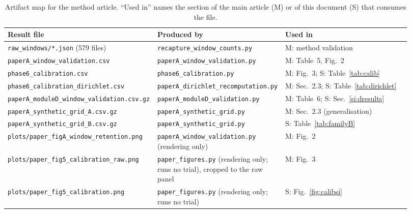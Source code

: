 \documentclass[final,5p,times,longtitle]{elsarticle}
\newenvironment{widetable}{\begin{table}[tbp]}{\end{table}}
\newenvironment{widetable}{\begin{table}[htbp]}{\end{table}}
\theoremstyle{plain}
\begin{document}
\begin{widetable}
\centering\small
\caption{Artifact map for the method article. ``Used in'' names the
section of the main article (M) or of this document (S) that consumes the
file.}
\label{tab:artifacts}
\scriptsize
\begin{tabular}{@{}>{\raggedright\arraybackslash}p{0.31\linewidth}>{\raggedright\arraybackslash}p{0.30\linewidth}>{\raggedright\arraybackslash}p{0.31\linewidth}@{}}
\toprule
Result file & Produced by & Used in \\
\midrule
\texttt{raw\_\allowbreak{}windows/*.json} (579 files) & \texttt{recapture\_\allowbreak{}window\_\allowbreak{}counts.py} & M: method validation \\
\texttt{paperA\_\allowbreak{}window\_\allowbreak{}validation.csv} & \texttt{paperA\_\allowbreak{}window\_\allowbreak{}validation.py} & M: Table~5, Fig.~2 \\
\texttt{phase6\_\allowbreak{}calibration.csv} & \texttt{phase6\_\allowbreak{}calibration.py} & M: Fig.~3; S: Table~\ref{tab:calib} \\
\texttt{phase6\_\allowbreak{}calibration\_\allowbreak{}dirichlet.csv} & \texttt{paperA\_\allowbreak{}dirichlet\_\allowbreak{}recomputation.py} & M: Sec.~2.3; S: Table~\ref{tab:dirichlet} \\
\texttt{paperA\_\allowbreak{}moduleD\_\allowbreak{}window\_\allowbreak{}validation.csv.gz} & \texttt{paperA\_\allowbreak{}moduleD\_\allowbreak{}validation.py} & M: Table~6; S: Sec.~\ref{si:dresults} \\
\texttt{paperA\_\allowbreak{}synthetic\_\allowbreak{}grid\_A.csv.gz} & \texttt{paperA\_\allowbreak{}synthetic\_\allowbreak{}grid.py} & M: Sec.~2.3 (generalisation) \\
\texttt{paperA\_\allowbreak{}synthetic\_\allowbreak{}grid\_B.csv.gz} & \texttt{paperA\_\allowbreak{}synthetic\_\allowbreak{}grid.py} & S: Table~\ref{tab:familyB} \\
\midrule
\texttt{plots/paper\_\allowbreak{}figA\_\allowbreak{}window\_\allowbreak{}retention.png} & \texttt{paperA\_\allowbreak{}window\_\allowbreak{}validation.py} (rendering only) & M: Fig.~2 \\
\texttt{plots/paper\_\allowbreak{}fig5\_\allowbreak{}calibration\_\allowbreak{}raw.png} & \texttt{paper\_\allowbreak{}figures.py} (rendering only; runs no trial), cropped to the raw panel & M: Fig.~3 \\
\texttt{plots/paper\_\allowbreak{}fig5\_\allowbreak{}calibration.png} & \texttt{paper\_\allowbreak{}figures.py} (rendering only; runs no trial) & S: Fig.~\ref{fig:calibsi} \\
\bottomrule
\end{tabular}
\end{widetable}
\end{document}
